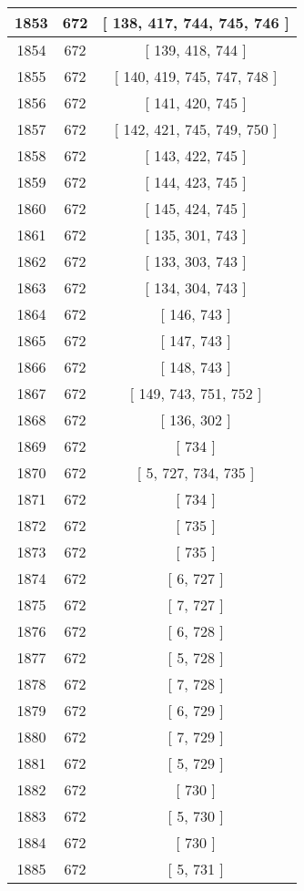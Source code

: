 \begin{center}
\begin{longtable}[H]{|| c c c ||}
\hline
1853 & 672 & [ 138, 417, 744, 745, 746 ] \\ 
\hline
1854 & 672 & [ 139, 418, 744 ] \\ 
\hline
1855 & 672 & [ 140, 419, 745, 747, 748 ] \\ 
\hline
1856 & 672 & [ 141, 420, 745 ] \\ 
\hline
1857 & 672 & [ 142, 421, 745, 749, 750 ] \\ 
\hline
1858 & 672 & [ 143, 422, 745 ] \\ 
\hline
1859 & 672 & [ 144, 423, 745 ] \\ 
\hline
1860 & 672 & [ 145, 424, 745 ] \\ 
\hline
1861 & 672 & [ 135, 301, 743 ] \\ 
\hline
1862 & 672 & [ 133, 303, 743 ] \\ 
\hline
1863 & 672 & [ 134, 304, 743 ] \\ 
\hline
1864 & 672 & [ 146, 743 ] \\ 
\hline
1865 & 672 & [ 147, 743 ] \\ 
\hline
1866 & 672 & [ 148, 743 ] \\ 
\hline
1867 & 672 & [ 149, 743, 751, 752 ] \\ 
\hline
1868 & 672 & [ 136, 302 ] \\ 
\hline
1869 & 672 & [ 734 ] \\ 
\hline
1870 & 672 & [ 5, 727, 734, 735 ] \\ 
\hline
1871 & 672 & [ 734 ] \\ 
\hline
1872 & 672 & [ 735 ] \\ 
\hline
1873 & 672 & [ 735 ] \\ 
\hline
1874 & 672 & [ 6, 727 ] \\ 
\hline
1875 & 672 & [ 7, 727 ] \\ 
\hline
1876 & 672 & [ 6, 728 ] \\ 
\hline
1877 & 672 & [ 5, 728 ] \\ 
\hline
1878 & 672 & [ 7, 728 ] \\ 
\hline
1879 & 672 & [ 6, 729 ] \\ 
\hline
1880 & 672 & [ 7, 729 ] \\ 
\hline
1881 & 672 & [ 5, 729 ] \\ 
\hline
1882 & 672 & [ 730 ] \\ 
\hline
1883 & 672 & [ 5, 730 ] \\ 
\hline
1884 & 672 & [ 730 ] \\ 
\hline
1885 & 672 & [ 5, 731 ] \\ 
\hline

\end{longtable}
\end{center}
